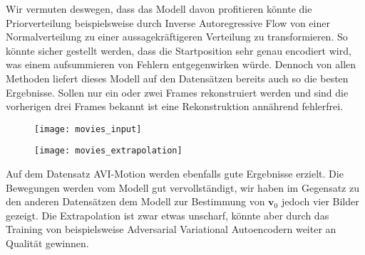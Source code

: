 \documentclass[12pt]{article}
\begin{document}
	Wir vermuten deswegen, dass das Modell davon profitieren könnte die Priorverteilung beispielsweise durch Inverse Autoregressive Flow von einer Normalverteilung zu einer aussagekräftigeren Verteilung zu transformieren. So könnte sicher gestellt werden, dass die Startposition sehr genau encodiert wird, was einem aufsummieren von Fehlern entgegenwirken würde.
	Dennoch von allen Methoden liefert dieses Modell auf den Datensätzen bereits auch so die besten Ergebnisse. Sollen nur ein oder zwei Frames rekonstruiert werden und sind die vorherigen drei Frames bekannt ist eine Rekonstruktion annährend fehlerfrei. 
	\begin{figure}[h!]
		\begin{minipage}[position=l]{0.5\textwidth}
			\begin{mdframed}[style=inner]
				\texttt{[image: movies\_input]}
			\end{mdframed}
		\end{minipage}
		\begin{minipage}[position=r]{0.5\textwidth}
			\begin{mdframed}[style=inner]
				\texttt{[image: movies\_extrapolation]}
			\end{mdframed}
		\end{minipage}
	\end{figure}
	Auf dem Datensatz AVI-Motion werden ebenfalls gute Ergebnisse erzielt. Die Bewegungen werden vom Modell gut vervollständigt, wir haben im Gegensatz zu den anderen Datensätzen dem Modell zur Bestimmung von $\mathbf{v}_0$ jedoch vier Bilder gezeigt. Die Extrapolation ist zwar etwas unscharf, könnte aber durch das Training von beispielsweise Adversarial Variational Autoencodern weiter an Qualität gewinnen. 
	
	
	\newpage
\end{document}
